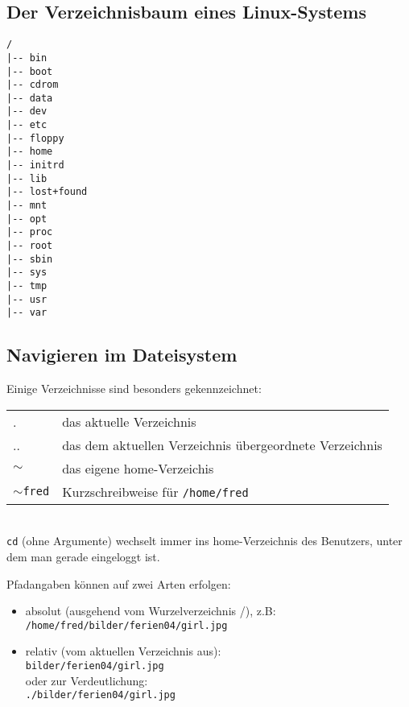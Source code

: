 \documentclass[11pt]{article}
\begin{document}
\subsection{Der Verzeichnisbaum eines Linux-Systems}
\begin{samepage}
\begin{verbatim}
/
|-- bin
|-- boot
|-- cdrom
|-- data
|-- dev
|-- etc
|-- floppy
|-- home
|-- initrd
|-- lib
|-- lost+found
|-- mnt
|-- opt
|-- proc
|-- root
|-- sbin
|-- sys
|-- tmp
|-- usr
|-- var

\end{verbatim}
\end{samepage}

\subsection{Navigieren im Dateisystem}
Einige Verzeichnisse sind besonders gekennzeichnet:\\

\begin{tabular}{ll}
. & das aktuelle Verzeichnis \\
.. & das dem aktuellen Verzeichnis übergeordnete Verzeichnis \\
$\sim$ & das eigene home-Verzeichis \\
$\sim$\texttt{fred} & Kurzschreibweise für \texttt{/home/fred} \\
\end{tabular} \\

\texttt{cd} (ohne Argumente) wechselt immer ins home-Verzeichnis des
Benutzers, unter dem man gerade eingeloggt ist.

Pfadangaben können auf zwei Arten erfolgen:
\begin{itemize}
\item absolut (ausgehend vom Wurzelverzeichnis /), z.B: \\
\texttt{/home/fred/bilder/ferien04/girl.jpg}
\item relativ (vom aktuellen Verzeichnis aus):\\
\texttt{bilder/ferien04/girl.jpg}\\
oder zur Verdeutlichung:\\
\texttt{./bilder/ferien04/girl.jpg}
\end{itemize}
\end{document}
